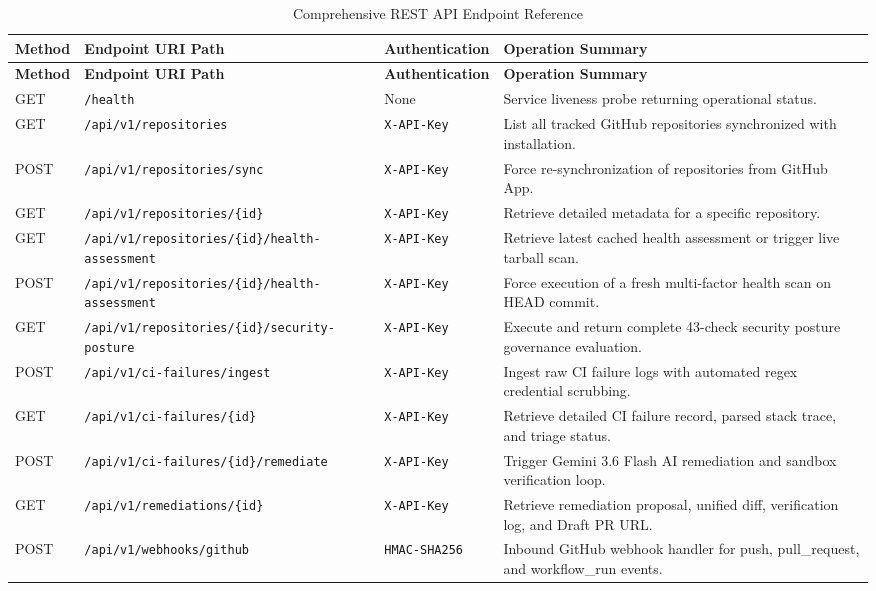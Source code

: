 \begin{longtable}{p{} p{} p{} p{}}
\caption{Comprehensive REST API Endpoint Reference} \label{tab:app-api-reference} \\
\toprule
\textbf{Method} & \textbf{Endpoint URI Path} & \textbf{Authentication} & \textbf{Operation Summary} \\
\midrule
\endfirsthead
\toprule
\textbf{Method} & \textbf{Endpoint URI Path} & \textbf{Authentication} & \textbf{Operation Summary} \\
\midrule
\endhead
\bottomrule
\endfoot
\bottomrule
\endlastfoot

GET & \texttt{/health} & None & Service liveness probe returning operational status. \\
\addlinespace
GET & \texttt{/api/v1/repositories} & \texttt{X-API-Key} & List all tracked GitHub repositories synchronized with installation. \\
\addlinespace
POST & \texttt{/api/v1/repositories/sync} & \texttt{X-API-Key} & Force re-synchronization of repositories from GitHub App. \\
\addlinespace
GET & \texttt{/api/v1/repositories/\{id\}} & \texttt{X-API-Key} & Retrieve detailed metadata for a specific repository. \\
\addlinespace
GET & \texttt{/api/v1/repositories/\{id\}/health-assessment} & \texttt{X-API-Key} & Retrieve latest cached health assessment or trigger live tarball scan. \\
\addlinespace
POST & \texttt{/api/v1/repositories/\{id\}/health-assessment} & \texttt{X-API-Key} & Force execution of a fresh multi-factor health scan on HEAD commit. \\
\addlinespace
GET & \texttt{/api/v1/repositories/\{id\}/security-posture} & \texttt{X-API-Key} & Execute and return complete 43-check security posture governance evaluation. \\
\addlinespace
POST & \texttt{/api/v1/ci-failures/ingest} & \texttt{X-API-Key} & Ingest raw CI failure logs with automated regex credential scrubbing. \\
\addlinespace
GET & \texttt{/api/v1/ci-failures/\{id\}} & \texttt{X-API-Key} & Retrieve detailed CI failure record, parsed stack trace, and triage status. \\
\addlinespace
POST & \texttt{/api/v1/ci-failures/\{id\}/remediate} & \texttt{X-API-Key} & Trigger Gemini 3.6 Flash AI remediation and sandbox verification loop. \\
\addlinespace
GET & \texttt{/api/v1/remediations/\{id\}} & \texttt{X-API-Key} & Retrieve remediation proposal, unified diff, verification log, and Draft PR URL. \\
\addlinespace
POST & \texttt{/api/v1/webhooks/github} & \texttt{HMAC-SHA256} & Inbound GitHub webhook handler for push, pull\_request, and workflow\_run events. \\
\end{longtable}

